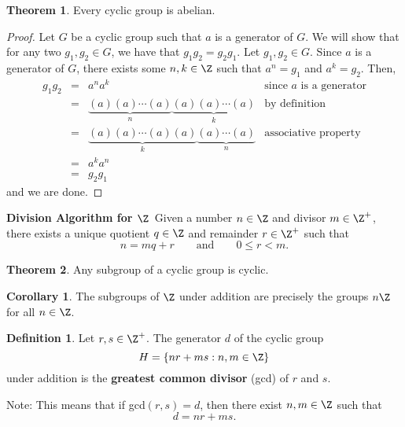 \documentclass[a5paper]{article}
\theoremstyle{definition}%
\newtheorem*{theorem*}{Theorem} %
\newtheorem*{corollary*}{Corollary}
\newtheorem*{definition*}{Definition}
\numberwithin{exercise}{section}
\theoremstyle{remark}%
\begin{document}
\begin{theorem*}
Every cyclic group is abelian. 
\end{theorem*}
\begin{proof}
Let $G$ be a cyclic group such that $a$ is a generator of $G$. We will show that for any two $g_1, g_2\in G$, we have that $g_1g_2=g_2g_1$. Let $g_1, g_2\in G$. Since $a$ is a generator of $G$, there exists some $n,k\in \Z$ such that $a^n=g_1$ and $a^k=g_2$. Then, 
\[\begin{array}{rcll}
g_1g_2 &=& a^na^k & \text{since }a\text{ is a generator}\\
&=& \underbrace{(a)(a) \cdots (a)}_{n}\underbrace{(a)(a) \cdots (a)}_{k} & \text{by definition}\\
&=& \underbrace{(a)(a) \cdots (a)(a)}_{k}\underbrace{(a) \cdots (a)}_{n} & \text{associative property}\\
&=&a^ka^n\\
&=&g_2g_1
\end{array}\]
and we are done.
\end{proof}

\begin{highlight}
\textbf{Division Algorithm for $\Z$}\, Given a number $n\in\Z$ and divisor $m\in\Z^+$, there exists a unique quotient $q\in\Z$ and remainder $r\in\Z^+$ such that 
$$n=mq+r\quad\quad\text{and}\quad\quad 0\leq r<m.$$
\end{highlight}

\begin{highlight}
\begin{theorem*}
Any subgroup of a cyclic group is cyclic. 
\end{theorem*}
\end{highlight}

\begin{corollary*}
The subgroups of $\Z$ under addition are precisely the groups $n\Z$ for all $n\in\Z$.
\end{corollary*}

\begin{highlight}
\begin{definition*}
Let $r, s\in \Z^+$. The generator $d$ of the cyclic group 
$$H=\{nr+ms:n,m\in\Z\}$$
under addition is the \textbf{greatest common divisor} (gcd) of $r$ and $s$. 
\end{definition*}
\end{highlight}

Note: This means that if gcd$(r,s)=d$, then there exist $n,m\in\Z$ such that 
$$d=nr+ms.$$
\end{document}

